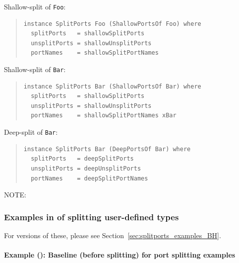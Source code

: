Shallow-split of {\tt Foo}:
\begin{quote}
\begin{verbatim}
instance SplitPorts Foo (ShallowPortsOf Foo) where
  splitPorts   = shallowSplitPorts
  unsplitPorts = shallowUnsplitPorts
  portNames    = shallowSplitPortNames
\end{verbatim}
\end{quote}

Shallow-split of {\tt Bar}:
\begin{quote}
\begin{verbatim}
instance SplitPorts Bar (ShallowPortsOf Bar) where
  splitPorts   = shallowSplitPorts
  unsplitPorts = shallowUnsplitPorts
  portNames    = shallowSplitPortNames xBar
\end{verbatim}
\end{quote}

Deep-split of {\tt Bar}:
\begin{quote}
\begin{verbatim}
instance SplitPorts Bar (DeepPortsOf Bar) where
  splitPorts   = deepSplitPorts
  unsplitPorts = deepUnsplitPorts
  portNames    = deepSplitPortNames
\end{verbatim}
\end{quote}

NOTE: \hfill {}


\subsubsection{Examples in {\BSVb} of splitting user-defined types}


\label{sec:splitports_examples_BSV}

{\footnotesize
For {\BHb} versions of these, please see Section~\ref{sec:splitports_examples_BH}.}


\paragraph{Example ({\BSVb}): Baseline (before splitting) for port splitting examples}

